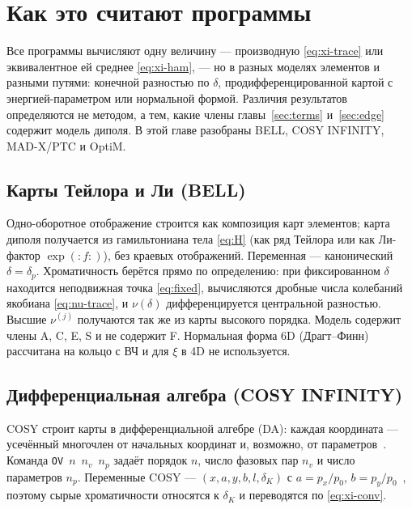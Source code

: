 \section{Как это считают программы}
\label{sec:codes}

Все программы вычисляют одну величину --- производную \eqref{eq:xi-trace} или эквивалентное ей среднее \eqref{eq:xi-ham}, --- но в разных моделях элементов и разными путями: конечной разностью по $\delta$, продифференцированной картой с энергией-параметром или нормальной формой. Различия результатов определяются не методом, а тем, какие члены главы~\ref{sec:terms} и~\ref{sec:edge} содержит модель диполя. В этой главе разобраны BELL, COSY INFINITY, MAD-X/PTC и OptiM.

\subsection{Карты Тейлора и Ли (BELL)}

Одно-оборотное отображение строится как композиция карт элементов; карта диполя получается из гамильтониана тела \eqref{eq:H} (как ряд Тейлора или как Ли-фактор $\exp(:f:)$), без краевых отображений. Переменная --- канонический $\delta=\delta_p$. Хроматичность берётся прямо по определению: при фиксированном $\delta$ находится неподвижная точка \eqref{eq:fixed}, вычисляются дробные числа колебаний якобиана \eqref{eq:nu-trace}, и $\nu(\delta)$ дифференцируется центральной разностью. Высшие $\nu^{(j)}$ получаются так же из карты высокого порядка. Модель содержит члены A, C, E, S и не содержит F. Нормальная форма 6D (Драгт--Финн) рассчитана на кольцо с ВЧ и для $\xi$ в 4D не используется.

\subsection{Дифференциальная алгебра (COSY INFINITY)}

COSY строит карты в дифференциальной алгебре (DA): каждая координата --- усечённый многочлен от начальных координат и, возможно, от параметров~\cite{Berz1999,COSYManual}. Команда \texttt{OV}~$n$~$n_v$~$n_p$ задаёт порядок $n$, число фазовых пар $n_v$ и число параметров $n_p$. Переменные COSY --- $(x,a,y,b,l,\delta_K)$ с $a=p_x/p_0$, $b=p_y/p_0$~\cite{ValetovPhD}, поэтому сырые хроматичности относятся к $\delta_K$ и переводятся по \eqref{eq:xi-conv}.

